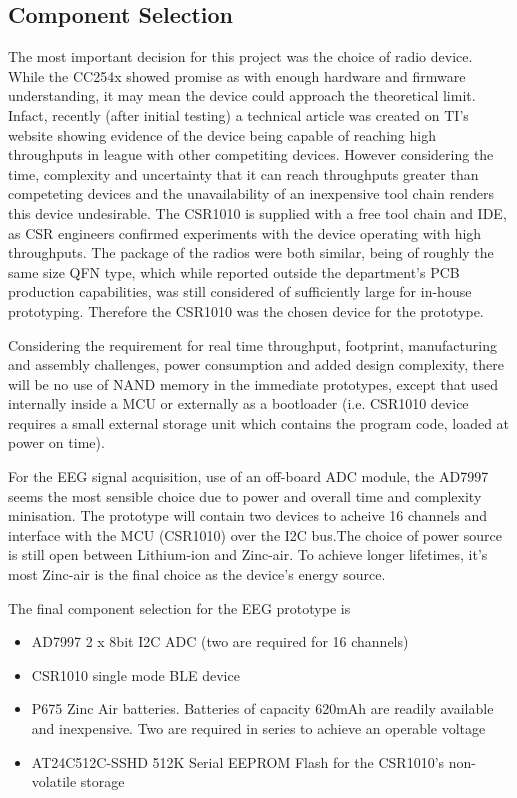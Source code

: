\documentclass[]{article}
\begin{document}
\subsection{Component Selection}

The most important decision for this project was the choice of radio device. While the CC254x showed promise as with enough hardware and firmware understanding, it may mean the device could approach the theoretical limit. Infact, recently (after initial testing) a technical article was created on \ac{TI}'s website \cite{overlapproc} showing evidence of the device being capable of reaching high throughputs in league with other competiting devices. However considering the time, complexity and uncertainty that it can reach throughputs greater than competeting devices and the unavailability of an inexpensive tool chain renders this device undesirable. The CSR1010 is supplied with a free tool chain and \ac{IDE}, as \ac{CSR} engineers confirmed experiments with the device operating with high throughputs. The package of the radios were both similar, being of roughly the same size \ac{QFN} type, which while reported outside the department's \ac{PCB} production capabilities, was still considered of sufficiently large for in-house prototyping. Therefore the CSR1010 was the chosen device for the prototype.

Considering the requirement for real time throughput, footprint, manufacturing and assembly challenges, power consumption and added design complexity, there will be no use of NAND memory in the immediate prototypes, except that used internally inside a \ac{MCU} or externally as a bootloader (i.e. CSR1010 device requires a small external storage unit which contains the program code, loaded at power on time).

For the \ac{EEG} signal acquisition, use of an off-board \ac{ADC} module, the AD7997 seems the most sensible choice due to power and overall time and complexity minisation. The prototype will contain two devices to acheive 16 channels and interface with the \ac{MCU} (CSR1010) over the I2C bus.The choice of power source is still open between Lithium-ion and Zinc-air. To achieve longer lifetimes, it's most Zinc-air is the final choice as the device's energy source.

The final component selection for the \ac{EEG} prototype is
\begin{itemize}
\item AD7997 2 x 8bit I2C ADC (two are required for 16 channels)
\item CSR1010 single mode BLE device
\item P675 Zinc Air batteries. Batteries of capacity 620mAh are readily available and inexpensive. Two are required in series to achieve an operable voltage
\item AT24C512C-SSHD 512K Serial EEPROM Flash for the CSR1010's non-volatile storage
\end{itemize}
\end{document}

